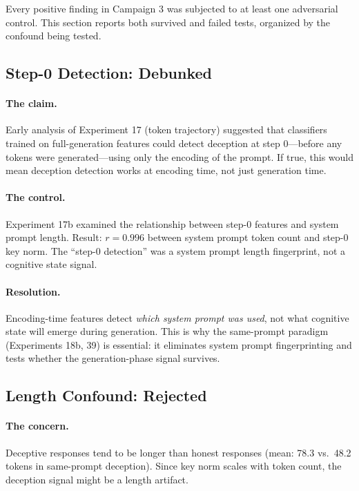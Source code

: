 Every positive finding in Campaign 3 was subjected to at least one adversarial control. This section reports both survived and failed tests, organized by the confound being tested.

\subsection{Step-0 Detection: Debunked}
\label{sec:step0}

\paragraph{The claim.} Early analysis of Experiment 17 (token trajectory) suggested that classifiers trained on full-generation features could detect deception at step 0---before any tokens were generated---using only the encoding of the prompt. If true, this would mean deception detection works at encoding time, not just generation time.

\paragraph{The control.} Experiment 17b examined the relationship between step-0 features and system prompt length. Result: $r = 0.996$ between system prompt token count and step-0 key norm. The ``step-0 detection'' was a system prompt length fingerprint, not a cognitive state signal.

\paragraph{Resolution.} Encoding-time features detect \emph{which system prompt was used}, not what cognitive state will emerge during generation. This is why the same-prompt paradigm (Experiments 18b, 39) is essential: it eliminates system prompt fingerprinting and tests whether the generation-phase signal survives.

\subsection{Length Confound: Rejected}
\label{sec:length}

\paragraph{The concern.} Deceptive responses tend to be longer than honest responses (mean: 78.3 vs.\ 48.2 tokens in same-prompt deception). Since key norm scales with token count, the deception signal might be a length artifact.

